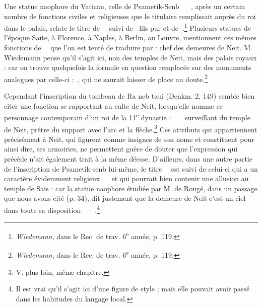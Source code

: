\documentclass[a4paper, 11pt, oneside]{article}
\newcommand*\hieroglyhicsAAAH{}
\newcommand*\hieroglyhicsAAAI{}
\newcommand*\hieroglyhicsAAAO{}
\newcommand*\hieroglyhicsAAAQ{}
\newcommand*\hieroglyhicsAABR{}
\newcommand*\hieroglyhicsAACM{}
\newcommand*\hieroglyhicsAACN{\raisebox{1ex}{}}
\newcommand*\hieroglyhicsAACS{}
\newcommand*\hieroglyhicsAADY{}
\newcommand*\hieroglyhicsAAHA{}
\newcommand*\hieroglyhicsAAHC{}
\newcommand*\hieroglyhicsAAHK{}
\newcommand*\hieroglyhicsAAHR{}
\newcommand*\hieroglyhicsAAHS{}
\newcommand*\hieroglyhicsAAHZ{}
\newcommand*\hieroglyhicsAALJ{}
\newcommand*\hieroglyhicsAAOH{}
\newcommand*\hieroglyhicsAAOR{}
\newcommand*\hieroglyhicsAAOX{}
\newcommand*\hieroglyhicsAAPB{}
\newcommand*\hieroglyhicsAAPC{\raisebox{0.5ex}{}}
\newcommand*\hieroglyhicsAAPH{}
\newcommand*\hieroglyhicsAAQA{}
\newcommand*\hieroglyhicsAAQB{}
\newcommand*\hieroglyhicsAAQC{}
\newcommand*\hieroglyhicsAAQD{}
\newcommand*\hieroglyhicsAAQE{}
\newcommand*\hieroglyhicsAAQF{}
\newcommand*\hieroglyhicsAAQG{}
\newcommand*\hieroglyhicsAAQH{}
\newcommand*\hieroglyhicsAAQI{}
\begin{document}
Une statue naophore du Vatican, celle de Psametik-Senb $\hieroglyhicsAAAH\:\hieroglyhicsAAQA\:\hieroglyhicsAAQB\allowbreak\:\hieroglyhicsAACM\:\hieroglyhicsAALJ\allowbreak\:\hieroglyhicsAAAQ\:\hieroglyhicsAAAO$, après un certain nombre de fonctions civiles et religieuses que le titulaire remplissait auprès du roi dans le palais, relate le titre de $\hieroglyhicsAAOR\:\hieroglyhicsAAHA\allowbreak\:\hieroglyhicsAAOH\:\hieroglyhicsAAQC$ suivi de $\hieroglyhicsAAAI\:\hieroglyhicsAADY$ fils pur et de $\hieroglyhicsAAOX\:\hieroglyhicsAAQD$.\footnote{\emph{Wiedemann}, dans le Rec. de trav. 6\textsuperscript{e} année, p. 119.} Plusieurs statues de l'époque Saïte, à Florence, à Naples, à Berlin, au Louvre, mentionnent ces mêmes fonctions de $\hieroglyhicsAAOR\:\hieroglyhicsAAHA\allowbreak\:\hieroglyhicsAAAQ\:\hieroglyhicsAAQC$ que l'on est tenté de traduire par : chef des demeures de Neit. M. Wiedemann pense qu'il s'agit ici, non des temples de Neit, mais des palais royaux : car on trouve quelquefois la formule en question remplacée sur des monuments analogues par celle-ci : $\hieroglyhicsAAQE\:\hieroglyhicsAAQC$, qui ne saurait laisser de place au doute.\footnote{\emph{Wiedemann}, dans le Rec. de trav. 6\textsuperscript{e} année, p. 119.}

Cependant l'inscription du tombeau de Ra neb taui (Denkm. 2, 149) semble bien citer une fonction se rapportant au culte de Neit, lorsqu'elle nomme ce personnage contemporain d'un roi de la 11\textsuperscript{e} dynastie : $\hieroglyhicsAAQI\:\hieroglyhicsAAHA\:\hieroglyhicsAAQC\allowbreak\:\hieroglyhicsAAHC\:\hieroglyhicsAAQF\allowbreak\:\hieroglyhicsAABR\:\hieroglyhicsAAQG$ surveillant du temple de Neit, prêtre du support avec l'arc et la flèche.\footnote{V. plus loin, même chapitre.} Ces attributs qui appartiennent précisément à Neit, qui figurent comme insignes de son nome et constituent pour ainsi dire, ses armoiries, ne permettent guère de douter que l'expression qui précède n'ait également trait à la même déesse. D'ailleurs, dans une autre partie de l'inscription de Psametik-senb lui-même, le titre $\hieroglyhicsAAOR\:\hieroglyhicsAAHA\allowbreak\:\hieroglyhicsAAAQ\:\hieroglyhicsAAQC$ est suivi de celui-ci qui a un caractère évidemment religieux $\hieroglyhicsAAPB\:\hieroglyhicsAACS\:\hieroglyhicsAAQH\allowbreak\:\hieroglyhicsAACN\:\hieroglyhicsAAPH$ et qui pourrait bien contenir une allusion au temple de Saïs : car la statue naophore étudiée par M. de Rougé, dans un passage que nous avons cité (p. 34), dit justement que la demeure de Neit c'est un ciel dans toute sa disposition $\hieroglyhicsAAAO\:\hieroglyhicsAAHK\:\hieroglyhicsAAPC\allowbreak\:\hieroglyhicsAAHZ\:\hieroglyhicsAABR\:\hieroglyhicsAACS\allowbreak\:\hieroglyhicsAAHR\:\hieroglyhicsAAHS$.\footnote{Il est vrai qu'il s'agit ici d'une figure de style ; mais elle pouvait avoir passé dans les habitudes du langage local.}
\end{document}
